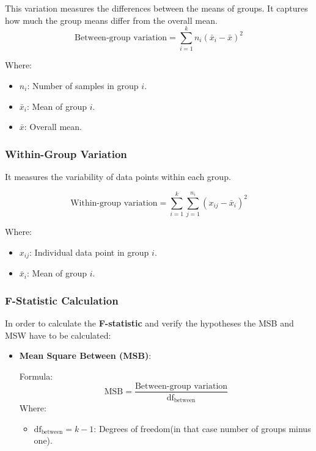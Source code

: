 This variation measures the differences between the means of groups. It
captures how much the group means differ from the overall mean.
\[
\text{Between-group \  variation} = \sum_{i=1}^{k} n_i (\bar{x}_i - \bar{x})^2
\]

\noindent \noindent Where:
\begin{itemize}
    \item \(n_i\): Number of samples in group \(i\).
    \item \(\bar{x}_i\): Mean of group \(i\).
    \item \(\bar{x}\): Overall mean.
\end{itemize}


\subsubsection*{Within-Group Variation}
It measures the variability of data points within each group.

\[
\text{Within-group  \ variation} = \sum_{i=1}^{k} \sum_{j=1}^{n_i} (x_{ij} - \bar{x}_i)^2
\]

\noindent \noindent Where:
\begin{itemize}
    \item \(x_{ij}\): Individual data point in group \(i\).
    \item \(\bar{x}_i\): Mean of group \(i\).
\end{itemize}



\subsubsection*{F-Statistic Calculation}
In order to calculate the \textbf{F-statistic} and verify the hypotheses
the MSB and MSW have to be calculated:

\begin{itemize}
    \item \textbf{Mean Square Between (MSB)}:
    
    Formula:
    \[
    \text{MSB} = \frac{\text{Between-group variation}}{\text{df}_{\text{between}}}
    \]
    \noindent \noindent Where:
    \begin{itemize}
        \item \( \text{df}_{\text{between}} = k - 1 \): Degrees of freedom(in
          that case number of groups minus one).
    \end{itemize}
\end{itemize}


